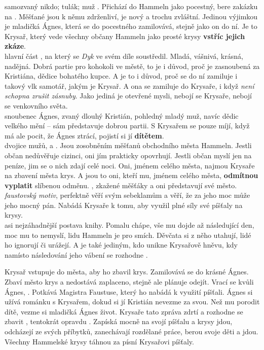 \documentclass{extarticle} %
\begin{document}
\noindent 
{} samozvaný nikdo; tulák; muž .
Přichází do Hammeln jako pocestný, bere zakázku na .
Měšťané jsou k němu zdrženliví, je nový a trochu zvláštní.
Jedinou výjimkou je mladičká Ágnes, která se do pocestného zamilovává, stejně jako on do ní.
Je to Krysař, který vede všechny občany Hammeln jako prosté krysy \textbf{vstříc jejich zkáze}.\\
 hlavní část , na který se \textit{Dyk} ve svém díle soustředil.
Mladá, vášnivá, krásná, nadějná.
Dobrá partie pro kohokoli ve městě, to je i důvod, proč je zasnoubená za Kristiána, dědice bohatého kupce.
A je to i důvod, proč se do ní zamiluje i takový vlk samotář, jakým je Krysař.
A ona se zamiluje do Krysaře, i když \textit{není schopna zrušit zásnuby}.
Jako jediná je otevřené mysli, nebojí se Krysaře, nebojí se venkovního světa.\\
 snoubenec Ágnes, zvaný dlouhý Kristián, pohledný mladý muž, navíc dědic velkého mění -- sám představuje dobrou partii.
S Krysařem se pouze míjí, když má ale pocit, že Ágnes ztrácí, pojistí si jí \textbf{dítětem}.\\
 dvojice mužů,  a .
Jsou zosobněním měšťanů obchodního města Hammeln.
Jestli občan nedůvěřuje cizinci, oni jím prakticky opovrhují.
Jestli občan myslí jen na peníze, jim se o nich zdají  celé noci.
Oni, jménem celého města, najmou Krysaře na zbavení města krys.
A jsou to oni, kteří mu, jménem celého města, \textbf{odmítnou vyplatit} slíbenou odměnu.
, zkažené měšťáky a oni představují své město.\\
 \textit{faustovský motiv}, perfektně věří svým sebeklamům a věří, že za jeho moc může jeho mocný pán.
Nabádá Krysaře k tomu, aby využil plné síly své píšťaly na krysy.\\
 asi nejzáhadnější postava knihy.
Pomalu chápe, vše mu dojde až následující den, moc mu to nemyslí, lidu Hammeln je pro smích.
Děvčata si z něho utahují, lidé ho ignorují či urážejí.
A je také jediným, kdo unikne Krysařově hněvu, kdy namísto následování jeho vábení se rozhodne .

\noindent Krysař vstupuje do města, aby ho zbavil krys.
Zamilovává se do krásné Ágnes.
Zbaví město krys a nedostává zaplaceno, stejně ale plánuje odejít.
Vrací se kvůli Ágnes, .
Potkává Magistra Faustuse, který ho nabádá k využití píšťali.
Ágnes si užívá románku s Krysařem, dokud si jí Kristián nevezme za svou.
Než mu porodit dítě, vezme si mladičká Ágnes život.
Krysaře tato zpráva zdrtí a rozhodne se zbavit , tentokrát opravdu .
Zapíská mocně na svojí píšťalu a krysy jdou, odcházejí ze svých příbytků, zanechávají rozdělané práce, berou svoje děti a jdou.
Všechny Hammelské krysy táhnou za písní Krysařovi píšťaly.
\end{document}
